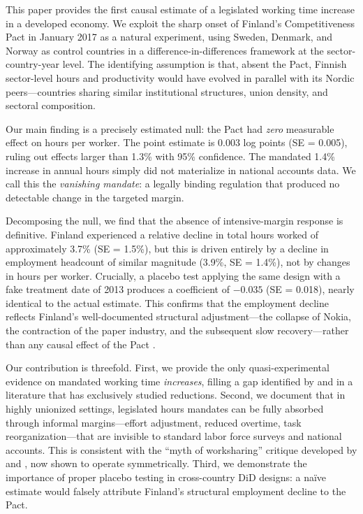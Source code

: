 \documentclass[12pt]{article}
\begin{document}
This paper provides the first causal estimate of a legislated working time increase in a developed economy. We exploit the sharp onset of Finland's Competitiveness Pact in January 2017 as a natural experiment, using Sweden, Denmark, and Norway as control countries in a difference-in-differences framework at the sector-country-year level. The identifying assumption is that, absent the Pact, Finnish sector-level hours and productivity would have evolved in parallel with its Nordic peers---countries sharing similar institutional structures, union density, and sectoral composition.

Our main finding is a precisely estimated null: the Pact had \textit{zero} measurable effect on hours per worker. The point estimate is 0.003 log points (SE = 0.005), ruling out effects larger than 1.3\% with 95\% confidence. The mandated 1.4\% increase in annual hours simply did not materialize in national accounts data. We call this the \textit{vanishing mandate}: a legally binding regulation that produced no detectable change in the targeted margin.

Decomposing the null, we find that the absence of intensive-margin response is definitive. Finland experienced a relative decline in total hours worked of approximately 3.7\% (SE = 1.5\%), but this is driven entirely by a decline in employment headcount of similar magnitude (3.9\%, SE = 1.4\%), not by changes in hours per worker. Crucially, a placebo test applying the same design with a fake treatment date of 2013 produces a coefficient of $-0.035$ (SE = 0.018), nearly identical to the actual estimate. This confirms that the employment decline reflects Finland's well-documented structural adjustment---the collapse of Nokia, the contraction of the paper industry, and the subsequent slow recovery---rather than any causal effect of the Pact \citep{oecd2018}.

Our contribution is threefold. First, we provide the only quasi-experimental evidence on mandated working time \textit{increases}, filling a gap identified by \citet{hamermesh2014} and \citet{huberman2007} in a literature that has exclusively studied reductions. Second, we document that in highly unionized settings, legislated hours mandates can be fully absorbed through informal margins---effort adjustment, reduced overtime, task reorganization---that are invisible to standard labor force surveys and national accounts. This is consistent with the ``myth of worksharing'' critique developed by \citet{kapteyn2004} and \citet{freeman1998}, now shown to operate symmetrically. Third, we demonstrate the importance of proper placebo testing in cross-country DiD designs: a na\"ive estimate would falsely attribute Finland's structural employment decline to the Pact.
\end{document}
